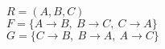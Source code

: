 \documentclass[preview]{standalone}
\begin{document}
$R = (A,B,C)$\\

$F = \big\{A\rightarrow B,\ B\rightarrow C,\ C\rightarrow A\big\}$\\
$G = \big\{C\rightarrow B,\ B\rightarrow A,\ A\rightarrow C\big\}$
\end{document}
